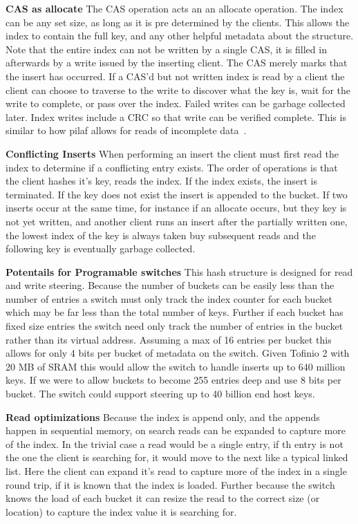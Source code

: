 \textbf{CAS as allocate} The CAS operation acts an an allocate operation. The
index can be any set size, as long as it is pre determined by the clients. This
allows the index to contain the full key, and any other helpful metadata about
the structure. Note that the entire index can not be written by a single CAS, it
is filled in afterwards by a write issued by the inserting client. The CAS
merely marks that the insert has occurred. If a CAS'd but not written index is
read by a client the client can choose to traverse to the write to discover what
the key is, wait for the write to complete, or pass over the index. Failed
writes can be garbage collected later. Index writes include a CRC so that write
can be verified complete. This is similar to how pilaf allows for reads of
incomplete data~\cite{pilaf}.

\textbf{Conflicting Inserts} When performing an insert the client must first
read the index to determine if a conflicting entry exists. The order of
operations is that the client hashes it's key, reads the index. If the index
exists, the insert is terminated. If the key does not exist the insert is
appended to the bucket. If two inserts occur at the same time, for instance if
an allocate occurs, but they key is not yet written, and another client runs an
insert after the partially written one, the lowest index of the key is always
taken buy subsequent reads and the following key is eventually garbage collected.

\textbf{Potentails for Programable switches} This hash structure is designed for
read and write steering. Because the number of buckets can be easily less than
the number of entries a switch must only track the index counter for each bucket
which may be far less than the total number of keys. Further if each bucket has
fixed size entries the switch need only track the number of entries in the
bucket rather than its virtual address. Assuming a max of 16 entries per bucket
this allows for only 4 bits per bucket of metadata on the switch. Given Tofinio
2 with 20 MB of SRAM this would allow the switch to handle inserts up to 640
million keys. If we were to allow buckets to become 255 entries deep and use 8
bits per bucket. The switch could support steering up to 40 billion end host
keys.

\textbf{Read optimizations} Because the index is append only, and the appends
happen in sequential memory, on search reads can be expanded to capture more of
the index. In the trivial case a read would be a single entry, if th entry is
not the one the client is searching for, it would move to the next like a
typical linked list. Here the client can expand it's read to capture more of the
index in a single round trip, if it is known that the index is loaded. Further
because the switch knows the load of each bucket it can resize the read to the
correct size (or location) to capture the index value it is searching for.

